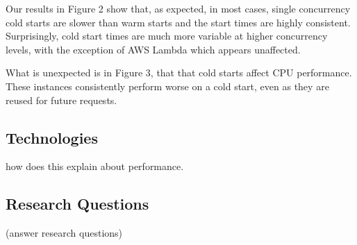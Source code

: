 \documentclass[11pt]{article}
\begin{document}
Our results in Figure 2 %
show that, as expected, in most cases,
single concurrency cold starts are slower than warm starts
and the start times are highly consistent.
Surprisingly, cold start times are much more variable at higher concurrency levels,
with the exception of AWS Lambda which appears unaffected.

What is unexpected is in Figure 3, %
that that cold starts affect CPU performance.
These instances consistently perform worse on a cold start,
even as they are reused for future requests.

\subsection{Technologies}
how does this explain about performance.

\subsection{Research Questions}
(answer research questions)
\end{document}
